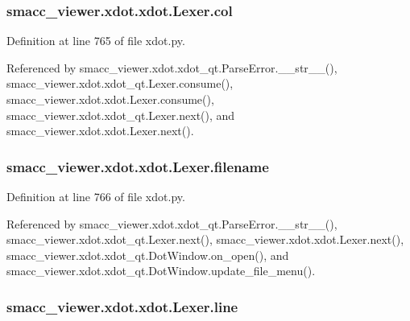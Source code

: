\subsubsection[{\texorpdfstring{col}{col}}]{\setlength{\rightskip}{0pt plus 5cm}smacc\+\_\+viewer.\+xdot.\+xdot.\+Lexer.\+col}\hypertarget{classsmacc__viewer_1_1xdot_1_1xdot_1_1Lexer_a1f662e52d39cd1cdddb5cfc02e549018}{}\label{classsmacc__viewer_1_1xdot_1_1xdot_1_1Lexer_a1f662e52d39cd1cdddb5cfc02e549018}


Definition at line 765 of file xdot.\+py.



Referenced by smacc\+\_\+viewer.\+xdot.\+xdot\+\_\+qt.\+Parse\+Error.\+\_\+\+\_\+str\+\_\+\+\_\+(), smacc\+\_\+viewer.\+xdot.\+xdot\+\_\+qt.\+Lexer.\+consume(), smacc\+\_\+viewer.\+xdot.\+xdot.\+Lexer.\+consume(), smacc\+\_\+viewer.\+xdot.\+xdot\+\_\+qt.\+Lexer.\+next(), and smacc\+\_\+viewer.\+xdot.\+xdot.\+Lexer.\+next().

\subsubsection[{\texorpdfstring{filename}{filename}}]{\setlength{\rightskip}{0pt plus 5cm}smacc\+\_\+viewer.\+xdot.\+xdot.\+Lexer.\+filename}\hypertarget{classsmacc__viewer_1_1xdot_1_1xdot_1_1Lexer_aeec6d9f9d2545d6a4bc01b386b81ac12}{}\label{classsmacc__viewer_1_1xdot_1_1xdot_1_1Lexer_aeec6d9f9d2545d6a4bc01b386b81ac12}


Definition at line 766 of file xdot.\+py.



Referenced by smacc\+\_\+viewer.\+xdot.\+xdot\+\_\+qt.\+Parse\+Error.\+\_\+\+\_\+str\+\_\+\+\_\+(), smacc\+\_\+viewer.\+xdot.\+xdot\+\_\+qt.\+Lexer.\+next(), smacc\+\_\+viewer.\+xdot.\+xdot.\+Lexer.\+next(), smacc\+\_\+viewer.\+xdot.\+xdot\+\_\+qt.\+Dot\+Window.\+on\+\_\+open(), and smacc\+\_\+viewer.\+xdot.\+xdot\+\_\+qt.\+Dot\+Window.\+update\+\_\+file\+\_\+menu().

\subsubsection[{\texorpdfstring{line}{line}}]{\setlength{\rightskip}{0pt plus 5cm}smacc\+\_\+viewer.\+xdot.\+xdot.\+Lexer.\+line}\hypertarget{classsmacc__viewer_1_1xdot_1_1xdot_1_1Lexer_a0176a7344cbcc6622d7153fa8141440c}{}\label{classsmacc__viewer_1_1xdot_1_1xdot_1_1Lexer_a0176a7344cbcc6622d7153fa8141440c}


